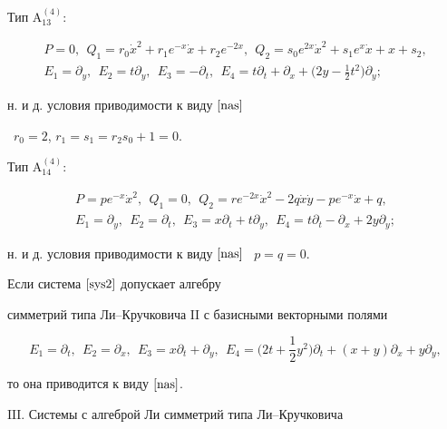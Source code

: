 \begin{thms}
Тип $\mathrm{A^{(4)}_{13}}{:}$


\begin{gather*}


P=0,\ \ Q_1=r_0\Dot x^2+r_1e^{-x}\Dot x+r_2e^{-2x},\ \


Q_2=s_0e^{2x}\Dot x^2+s_1e^{x}\Dot x+x+s_2, \\


%


E_1=\partial_y,\ \ E_2=t\partial_ y,\ \ E_3=-\partial_t,


\ \ E_4=t\partial_t+\partial_x+\bigg(2y-\frac12 t^2\bigg)\partial_y;


\end{gather*}


н. и д. условия приводимости к виду $\eqref{nas}$


\ $r_0=2$, $r_1=s_1=r_2s_0+1=0$.





Тип $\mathrm{A^{(4)}_{14}}{:}$


\begin{gather*}


P=pe^{-x}\Dot x^2,\ \ Q_1=0,\ \


Q_2=re^{-2x}\Dot x^2-2q\Dot x\Dot y-pe^{-x}\Dot x+q, \\


E_1=\partial_y,\ \ E_2=\partial_ t,\ \ E_3=x\partial_t+t\partial_y,


\ \ E_4=t\partial_t-\partial_x+2y\partial_y;


\end{gather*}


н. и д. условия приводимости к виду $\eqref{nas}$ \ $p=q=0$.





Если система $\eqref{sys2}$ допускает алгебру


симметрий типа Ли--Кручковича $\mathrm{II}$ с базисными векторными полями


$$


E_1=\partial_t,\ \ E_2=\partial_x,\ \ E_3=x\partial_t+\partial_y,


\ \ E_4=\bigg(2t+\frac12 y^2\bigg)\partial_t+(x+y)\partial_x+y\partial_y,


$$


то она приводится к виду $\eqref{nas}$.





$\mathrm{III}$. Системы с алгеброй Ли симметрий типа Ли--Кручковича



\end{thms}
